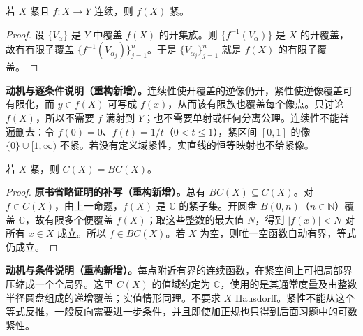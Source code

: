\documentclass[../../main.tex]{subfiles}%
\begin{document}
\begin{proposition}\label{proposition:ch04-continuous-image-compact}
若 $X$ 紧且 $f:X\to Y$ 连续，则 $f(X)$ 紧。
\end{proposition}
\begin{proof}
设 $\{V_\alpha\}$ 是 $Y$ 中覆盖 $f(X)$ 的开集族。则 $\{f^{-1}(V_\alpha)\}$ 是 $X$ 的开覆盖，故有有限子覆盖 $\{f^{-1}(V_{\alpha_j})\}_{j=1}^n$。于是 $\{V_{\alpha_j}\}_{j=1}^n$ 就是 $f(X)$ 的有限子覆盖。
\end{proof}
\begin{remark}
\textbf{动机与逐条件说明（重构新增）。}连续性使开覆盖的逆像仍开，紧性使逆像覆盖可有限化，而 $y\in f(X)$ 可写成 $f(x)$，从而该有限族也覆盖每个像点。只讨论 $f(X)$，所以不需要 $f$ 满射到 $Y$；也不需要单射或任何分离公理。连续性不能普遍删去：令 $f(0)=0$、$f(t)=1/t$（$0<t\le1$），紧区间 $[0,1]$ 的像 $\{0\}\cup[1,\infty)$ 不紧。若没有定义域紧性，实直线的恒等映射也不给紧像。
\end{remark}
\begin{corollary}\label{corollary:ch04-compact-continuous-bounded}
若 $X$ 紧，则 $C(X)=BC(X)$。
\end{corollary}
\begin{proof}
\textbf{原书省略证明的补写（重构新增）。}总有 $BC(X)\subseteq C(X)$。对 $f\in C(X)$，由上一命题，$f(X)$ 是 $\mathbb C$ 的紧子集。开圆盘 $B(0,n)$（$n\in\mathbb N$）覆盖 $\mathbb C$，故有限多个便覆盖 $f(X)$；取这些整数的最大值 $N$，得到 $|f(x)|<N$ 对所有 $x\in X$ 成立。所以 $f\in BC(X)$。若 $X$ 为空，则唯一空函数自动有界，等式仍成立。
\end{proof}
\begin{remark}
\textbf{动机与条件说明（重构新增）。}每点附近有界的连续函数，在紧空间上可把局部界压缩成一个全局界。这里 $C(X)$ 的值域约定为 $\mathbb C$，使用的是其通常度量及由整数半径圆盘组成的递增覆盖；实值情形同理。不要求 $X$ Hausdorff。紧性不能从这个等式反推，一般反向需要进一步条件，并且即使加正规也只得到后面习题中的可数紧性。
\end{remark}
\end{document}
